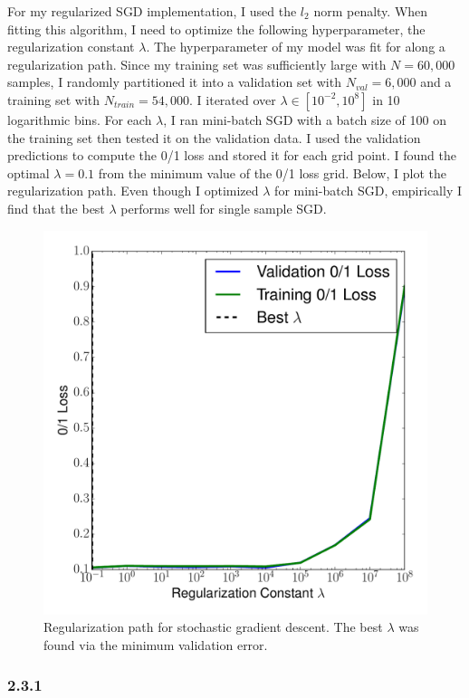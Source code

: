 \documentclass[12pt]{amsart}
\begin{document}
For my regularized SGD implementation, I used the $l_2$ norm penalty.  When fitting this algorithm, I need to optimize the following hyperparameter, the regularization constant $\lambda$.  The hyperparameter of my model was fit for along a regularization path.  Since my training set was sufficiently large with $N = 60,000$ samples, I randomly partitioned it into a validation set with $N_{val} = 6,000$ and a training set with $N_{train} = 54,000$.  I iterated over $\lambda \in [10^{-2},10^{8}]$ in 10 logarithmic bins.  For each $\lambda$, I ran mini-batch SGD with a batch size of 100 on the training set then tested it on the validation data.  I used the validation predictions to compute the 0/1 loss and stored it for each grid point.  I found the optimal $\lambda = 0.1$ from the minimum value of the 0/1 loss grid.  Below, I plot the regularization path.  Even though I optimized $\lambda$ for mini-batch SGD, empirically I find that the best $\lambda$ performs well for single sample SGD.
\begin{figure}[H]
	\includegraphics[width=\columnwidth]{sgd_reg_path.pdf}
    \caption{Regularization path for stochastic gradient descent.  The best $\lambda$ was found via the minimum validation error.}
    \label{fig:sgd_reg_path}
\end{figure}

\subsubsection*{2.3.1}
\end{document}
